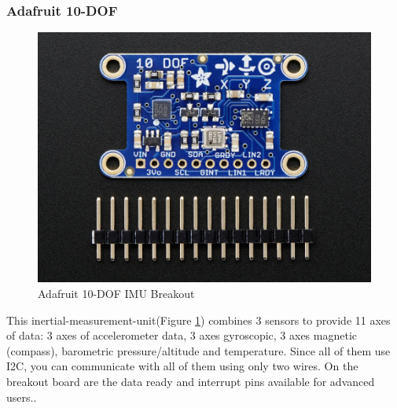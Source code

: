 \subsubsection{Adafruit 10-DOF} %
\label{ssub:adafruit_10_dof}
\begin{figure}[H]
\begin{center}
\captionsetup{font=small}
\includegraphics[scale=0.9]{pics/10dof.jpg}
\caption{Adafruit 10-DOF IMU Breakout\cite{ada_10dof}}
\label{fig:10dof}
\end{center}
\end{figure}
This inertial-measurement-unit(Figure \ref{fig:10dof}) combines 3 sensors to provide 11 axes of data: 3 axes of accelerometer data, 3 axes gyroscopic, 3 axes magnetic (compass), barometric pressure/altitude and temperature. Since all of them use I2C, you can communicate with all of them using only two wires. On the breakout board are the data ready and interrupt pins available for advanced users.\cite{ada_10dof}.
